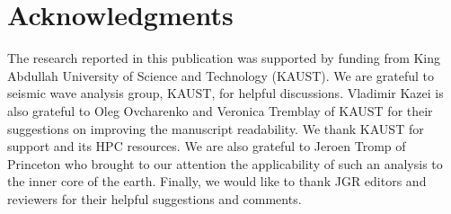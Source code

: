 \section{Acknowledgments}
The research reported in this publication was supported by funding from King Abdullah University of Science and Technology (KAUST). We are grateful to seismic wave analysis group, KAUST, for helpful discussions. Vladimir Kazei is also grateful to Oleg Ovcharenko and Veronica Tremblay of KAUST for their suggestions on improving the manuscript readability. We thank KAUST for support and its HPC resources. We are also grateful to Jeroen Tromp of Princeton who brought to our attention the applicability of such an analysis to the inner core of the earth. Finally, we would like to thank JGR editors and reviewers for their helpful suggestions and comments.

